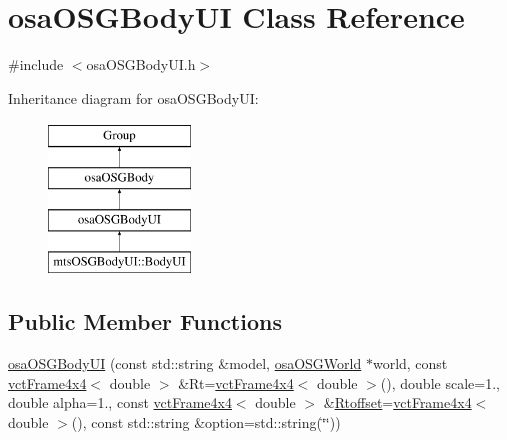 \hypertarget{classosa_o_s_g_body_u_i}{}\section{osa\+O\+S\+G\+Body\+U\+I Class Reference}
\label{classosa_o_s_g_body_u_i}


{\ttfamily \#include $<$osa\+O\+S\+G\+Body\+U\+I.\+h$>$}

Inheritance diagram for osa\+O\+S\+G\+Body\+U\+I\+:\begin{figure}[H]
\begin{center}
\leavevmode
\includegraphics[height=4.000000cm]{d8/d47/classosa_o_s_g_body_u_i}
\end{center}
\end{figure}
\subsection*{Public Member Functions}
\begin{DoxyCompactItemize}
\item 
\hyperlink{classosa_o_s_g_body_u_i_a447d7ecccd2158c0ee9558df22997638}{osa\+O\+S\+G\+Body\+U\+I} (const std\+::string \&model, \hyperlink{classosa_o_s_g_world}{osa\+O\+S\+G\+World} $\ast$world, const \hyperlink{classvct_frame4x4}{vct\+Frame4x4}$<$ double $>$ \&Rt=\hyperlink{classvct_frame4x4}{vct\+Frame4x4}$<$ double $>$(), double scale=1., double alpha=1., const \hyperlink{classvct_frame4x4}{vct\+Frame4x4}$<$ double $>$ \&\hyperlink{classosa_o_s_g_body_ad008984bdb0eda300948932eda13974a}{Rtoffset}=\hyperlink{classvct_frame4x4}{vct\+Frame4x4}$<$ double $>$(), const std\+::string \&option=std\+::string(\char`\"{}\char`\"{}))
\end{DoxyCompactItemize}
